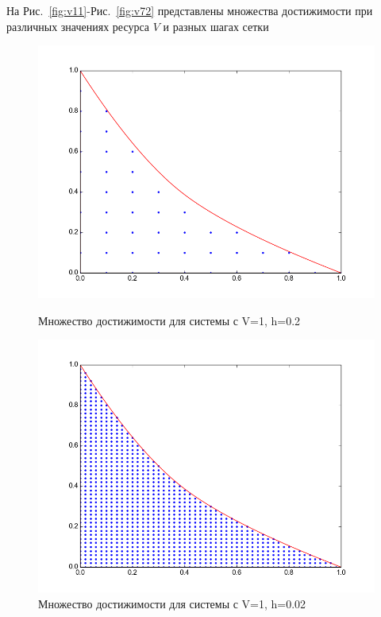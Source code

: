 На Рис.~\ref{fig:v11}-Рис.~\ref{fig:v72} представлены множества достижимости при различных
значениях ресурса $V$ и разных шагах сетки
\begin{figure}[h]
\centering
\begin{minipage}[h]{0.47\linewidth}
  \noindent \hfil
  \includegraphics[width=1\linewidth]{img/figure_v_1_h_01.png}
  \hfil \caption{Множество достижимости для системы с V=1, h=0.2}
  \label{fig:v11}
\end{minipage}
\hfill
\begin{minipage}[h]{0.47\linewidth}
  \noindent \hfil
  \includegraphics[width=1\linewidth]{img/figure_v_1_h_002.png}
  \hfil \caption{Множество достижимости для системы с V=1, h=0.02}
  \label{fig:v12}
\end{minipage}
\end{figure}
